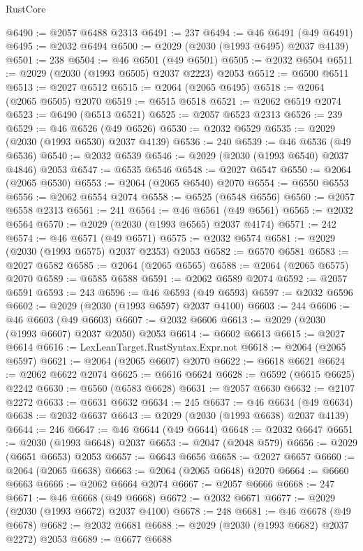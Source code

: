 \begin{lexlean}{RustCore}
\begin{coremodule}
@6490 := @2057 @6488 @2313
@6491 := 237
@6494 := @46 @6491 (@49 @6491)
@6495 := @2032 @6494
@6500 := @2029 (@2030 (@1993 @6495) @2037 @4139)
@6501 := 238
@6504 := @46 @6501 (@49 @6501)
@6505 := @2032 @6504
@6511 := @2029 (@2030 (@1993 @6505) @2037 @2223) @2053
@6512 := @6500 @6511
@6513 := @2027 @6512
@6515 := @2064 (@2065 @6495)
@6518 := @2064 (@2065 @6505) @2070
@6519 := @6515 @6518
@6521 := @2062 @6519 @2074
@6523 := @6490 (@6513 @6521)
@6525 := @2057 @6523 @2313
@6526 := 239
@6529 := @46 @6526 (@49 @6526)
@6530 := @2032 @6529
@6535 := @2029 (@2030 (@1993 @6530) @2037 @4139)
@6536 := 240
@6539 := @46 @6536 (@49 @6536)
@6540 := @2032 @6539
@6546 := @2029 (@2030 (@1993 @6540) @2037 @4846) @2053
@6547 := @6535 @6546
@6548 := @2027 @6547
@6550 := @2064 (@2065 @6530)
@6553 := @2064 (@2065 @6540) @2070
@6554 := @6550 @6553
@6556 := @2062 @6554 @2074
@6558 := @6525 (@6548 @6556)
@6560 := @2057 @6558 @2313
@6561 := 241
@6564 := @46 @6561 (@49 @6561)
@6565 := @2032 @6564
@6570 := @2029 (@2030 (@1993 @6565) @2037 @4174)
@6571 := 242
@6574 := @46 @6571 (@49 @6571)
@6575 := @2032 @6574
@6581 := @2029 (@2030 (@1993 @6575) @2037 @2353) @2053
@6582 := @6570 @6581
@6583 := @2027 @6582
@6585 := @2064 (@2065 @6565)
@6588 := @2064 (@2065 @6575) @2070
@6589 := @6585 @6588
@6591 := @2062 @6589 @2074
@6592 := @2057 @6591
@6593 := 243
@6596 := @46 @6593 (@49 @6593)
@6597 := @2032 @6596
@6602 := @2029 (@2030 (@1993 @6597) @2037 @4100)
@6603 := 244
@6606 := @46 @6603 (@49 @6603)
@6607 := @2032 @6606
@6613 := @2029 (@2030 (@1993 @6607) @2037 @2050) @2053
@6614 := @6602 @6613
@6615 := @2027 @6614
@6616 := LexLeanTarget.RustSyntax.Expr.not
@6618 := @2064 (@2065 @6597)
@6621 := @2064 (@2065 @6607) @2070
@6622 := @6618 @6621
@6624 := @2062 @6622 @2074
@6625 := @6616 @6624
@6628 := @6592 (@6615 @6625) @2242
@6630 := @6560 (@6583 @6628)
@6631 := @2057 @6630
@6632 := @2107 @2272
@6633 := @6631 @6632
@6634 := 245
@6637 := @46 @6634 (@49 @6634)
@6638 := @2032 @6637
@6643 := @2029 (@2030 (@1993 @6638) @2037 @4139)
@6644 := 246
@6647 := @46 @6644 (@49 @6644)
@6648 := @2032 @6647
@6651 := @2030 (@1993 @6648) @2037
@6653 := @2047 (@2048 @579)
@6656 := @2029 (@6651 @6653) @2053
@6657 := @6643 @6656
@6658 := @2027 @6657
@6660 := @2064 (@2065 @6638)
@6663 := @2064 (@2065 @6648) @2070
@6664 := @6660 @6663
@6666 := @2062 @6664 @2074
@6667 := @2057 @6666
@6668 := 247
@6671 := @46 @6668 (@49 @6668)
@6672 := @2032 @6671
@6677 := @2029 (@2030 (@1993 @6672) @2037 @4100)
@6678 := 248
@6681 := @46 @6678 (@49 @6678)
@6682 := @2032 @6681
@6688 := @2029 (@2030 (@1993 @6682) @2037 @2272) @2053
@6689 := @6677 @6688

\end{coremodule}
\end{lexlean}
